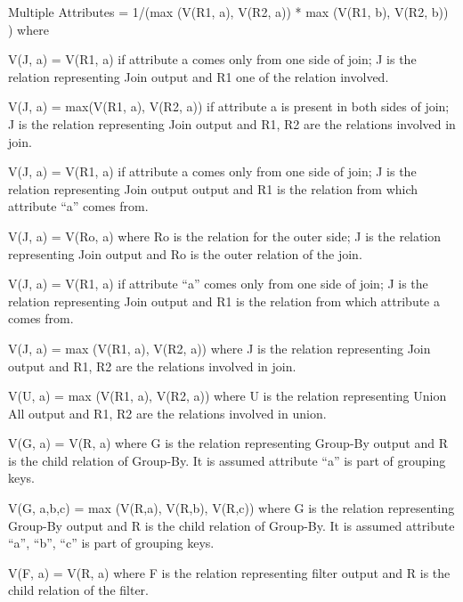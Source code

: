 \documentclass{vldb}
\newcommand{\ii}{\item}
\begin{document}
\ii Multiple Attributes = 1/(max (V(R1, a), V(R2, a)) * max (V(R1, b), V(R2, b)) ) where
\ii V(J, a) = V(R1, a) if attribute a comes only from one side of join; J is the relation representing Join output and R1 one of the relation involved.
\ii V(J, a) = max(V(R1, a), V(R2, a)) if attribute a is present in both sides of join; J is the relation representing Join output and R1, R2 are the relations involved in join.
\ii V(J, a) = V(R1, a) if attribute a comes only from one side of join; J is the relation representing Join output output and R1 is the relation from which attribute “a” comes from.
\ii V(J, a) = V(Ro, a) where Ro is the relation for the outer side; J is the relation representing Join output and Ro is the outer relation of the join.
\ii V(J, a) = V(R1, a) if attribute “a” comes only from one side of join; J is the relation representing Join output and R1 is the relation from which attribute a comes from.
\ii V(J, a) = max (V(R1, a), V(R2, a)) where J is the relation representing Join output and R1, R2 are the relations involved in join.
\ii V(U, a) = max (V(R1, a), V(R2, a)) where U is the relation representing Union All output and R1, R2 are the relations involved in union.
\ii V(G, a) = V(R, a) where G is the relation representing Group-By output and R is the child relation of Group-By. It is assumed attribute “a” is part of grouping keys.
\ii V(G, a,b,c) = max (V(R,a), V(R,b), V(R,c)) where G is the relation representing Group-By output and R is the child relation of Group-By. It is assumed attribute “a”, “b”, “c” is part of grouping keys.
\ii V(F, a) = V(R, a) where F is the relation representing filter output and R is the child relation of the filter.
\end{document}
